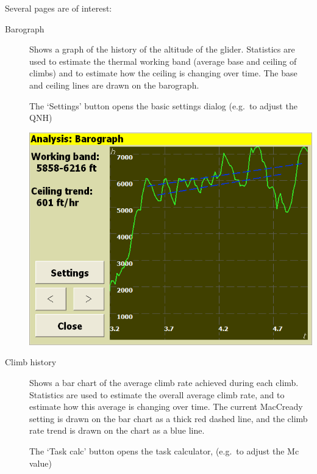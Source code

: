 \documentclass[a4paper,12pt]{refrep}
\begin{document}
Several pages are of interest:
\begin{description}
\item[Barograph]  Shows a graph of the history of the altitude of the glider.
  Statistics are used to estimate the thermal working band (average
  base and ceiling of climbs) and to estimate how the ceiling is
  changing over time.  The base and ceiling lines are drawn on the
  barograph.

  The `Settings' button opens the basic settings dialog
  (e.g.\ to adjust the QNH)

\begin{center}
\includegraphics[angle=0,width=\linewidth,keepaspectratio='true']{figures/analysis-barograph.png}
\end{center}

\item[Climb history]
  Shows a bar chart of the average climb rate achieved during each
  climb.  Statistics are used to estimate the overall average climb
  rate, and to estimate how this average is changing over time.  The
  current MacCready setting is drawn on the bar chart as a thick red
  dashed line, and the climb rate trend is drawn on the chart as a
  blue line.

  The `Task calc' button opens the task calculator,
  (e.g.\ to adjust the Mc value)


\end{description}
\end{document}
